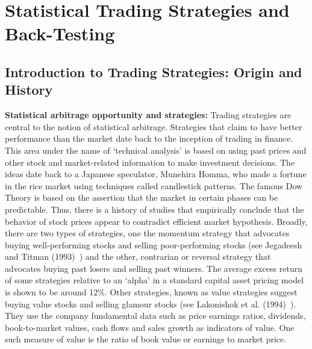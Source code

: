 \chapter{Statistical Trading Strategies and Back-Testing\label{ch:stat_ts}}
\section{Introduction to Trading Strategies: Origin and History}

\noindent\textbf{Statistical arbitrage opportunity and strategies:} Trading strategies are central to the notion of statistical arbitrage. Strategies that claim to have better performance than the market date back to the inception of trading in finance. This area under the name of `technical analysis' is based on using past prices and other stock and market-related information to make investment decisions. The ideas date back to a Japanese speculator, Munehira Homma, who made a fortune in the rice market using techniques called candlestick patterns. The famous Dow Theory is based on the assertion that the market in certain phases can be predictable. Thus, there is a history of studies that empirically conclude that the behavior of stock prices appear to contradict efficient market hypothesis. Broadly, there are two types of strategies, one the momentum strategy that  advocates buying well-performing stocks and selling poor-performing stocks (see Jegadeesh and Titman (1993)~\cite{JeTit}) and the other, contrarian or reversal strategy that advocates buying past losers and selling past winners. The average excess return of some strategies relative to an `alpha' in a standard capital asset pricing model is shown to be around 12\%. Other strategies, known as value strategies suggest buying value stocks and selling glamour stocks (see Lakonishok et al. (1994)~\cite{Lako}). They use the company fundamental data such as price earnings ratios, dividends, book-to-market values, cash flows and sales growth as indicators of value. One such measure of value is the ratio of book value or earnings to market price.


